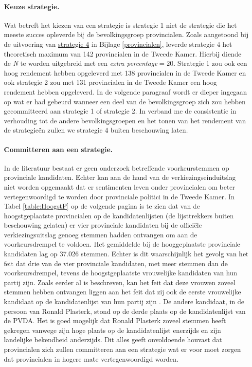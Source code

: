 \paragraph{Keuze strategie.}
Wat betreft het kiezen van een strategie is strategie 1 niet de strategie die het meeste succes opleverde bij de bevolkingsgroep provincialen. Zoals aangetoond bij de uitvoering van \hyperref[S4P]{strategie 4} in Bijlage \ref{provincialen}, leverde strategie 4 het theoretisch maximum van 142 provincialen in de Tweede Kamer. Hierbij diende de \textit{N} te worden uitgebreid met een \textit{extra percentage}$=20$. Strategie 1 zou ook een hoog rendement hebben opgeleverd met 138 provincialen in de Tweede Kamer en ook strategie 2 zou met 131 provincialen in de Tweede Kamer een hoog rendement hebben opgeleverd. In de volgende paragraaf wordt er dieper ingegaan op wat er had gebeurd wanneer een deel van de bevolkingsgroep zich zou hebben gecommitteerd aan strategie 1 of strategie 2. In verband me de consistentie in verhouding tot de andere bevolkingsgroepen en het tonen van het rendement van de strategie\"{e}n zullen we strategie 4 buiten beschouwing laten. 

\paragraph{Committeren aan een strategie.}
In de literatuur bestaat er geen onderzoek betreffende voorkeurstemmen op provinciale kandidaten. Echter kan aan de hand van de verkiezingseinduitslag niet worden opgemaakt dat er sentimenten leven onder provincialen om beter vertegenwoordigd te worden door provinciale politici in de Tweede Kamer. In Tabel \ref{table:HoogstP} op de volgende pagina is te zien dat van de hoogstgeplaatste provincialen op de kandidatenlijsten (de lijsttrekkers buiten beschouwing gelaten) er vier provinciale kandidaten bij de offici\"{e}le verkiezingsuitslag genoeg stemmen hadden ontvangen om aan de voorkeursdrempel te voldoen. Het gemiddelde bij de hooggeplaatste provinciale kandidaten lag op 37.026 stemmen. Echter is dit waarschijnlijk het gevolg van het feit dat drie van de vier provinciale kandidaten, met meer stemmen dan de voorkeursdrempel, tevens de hoogstgeplaatste vrouwelijke kandidaten van hun partij zijn. Zoals eerder al is beschreven, kan het feit dat deze vrouwen zoveel stemmen hebben ontvangen liggen aan het feit dat zij ook de eerste vrouwelijke kandidaat op de kandidatenlijst van hun partij zijn \citep{van2012tweede}. De andere kandidaat, in de persoon van Ronald Plasterk, stond op de derde plaats op de kandidatenlijst van de PVDA. Het is goed mogelijk dat Ronald Plasterk zoveel stemmen heeft gekregen vanwege zijn hoge plaats op de kandidatenlijst enerzijds en zijn landelijke bekendheid anderzijds. Dit alles geeft onvoldoende houvast dat provincialen zich zullen committeren aan een strategie wat er voor moet zorgen dat provincialen in hogere mate vertegenwoordigd worden. 


